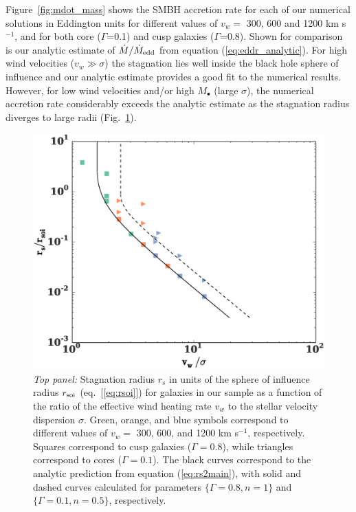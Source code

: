 \documentclass[usenatbib,fleqn]{mn2e}
\newcommand{\vwO}{v_{w}}
\begin{document}
 Figure~\ref{fig:mdot_mass} shows the SMBH accretion rate for each of our numerical solutions in Eddington units for different values of $\vwO =$ 300, 600 and 1200 km s$^{-1}$, and for both core ($\Gamma$=0.1) and cusp galaxies ($\Gamma$=0.8).  Shown for comparison is our analytic estimate of $\dot{M}/\dot{M}_{\rm edd}$ from equation (\ref{eq:eddr_analytic}).  For high wind velocities ($v_{w} \gg \sigma$) the stagnation lies well inside the black hole sphere of influence and our analytic estimate provides a good fit to the numerical results.  However, for low wind velocities and/or high $M_{\bullet}$ (large $\sigma$), the numerical accretion rate considerably exceeds the analytic estimate as the stagnation radius diverges to large radii (Fig.~\ref{fig:stag}).  

\begin{figure}
  \includegraphics[width=\columnwidth]{rs.eps}
  \caption{\label{fig:stag} \emph{Top panel:} Stagnation radius
    $r_{s}$ in units of the sphere of influence radius $r_{\rm
      soi}$ (eq.~[\ref{eq:rsoi}]) for galaxies in our sample as a
    function of the ratio of the effective wind heating rate $v_{w}$
    to the stellar velocity dispersion $\sigma$.  Green, orange, and
    blue symbols correspond to different values of $v_{w} =$ 300, 600, and 1200 km s$^{-1}$,
    respectively.  Squares correspond to cusp galaxies ($\Gamma = 0.8$), while
    triangles correspond to cores ($\Gamma = 0.1$). The black curves correspond to the
    analytic prediction from equation (\ref{eq:rs2main}), with solid and dashed curves calculated for parameters $\{\Gamma=0.8, n=1\}$ and $\{\Gamma=0.1,n=0.5\}$, respectively. }
\end{figure}
\end{document}
